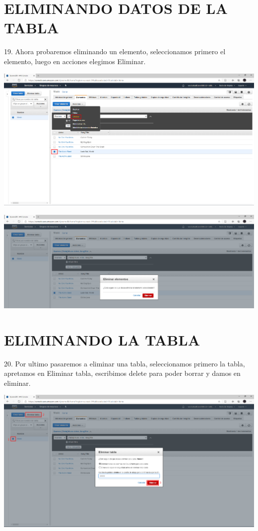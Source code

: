 \documentclass[12pt,letterpaper]{article}
\begin{document}
\section{ELIMINANDO DATOS DE LA TABLA}
19.	Ahora probaremos eliminando un elemento, seleccionamos primero el elemento, luego en acciones elegimos Eliminar.
\begin{center}
    \includegraphics[width=15cm]{img/19.png}  
\end{center}
\begin{center}
    \includegraphics[width=15cm]{img/19.1.png}  
\end{center}
\newpage

\section{ELIMINANDO LA TABLA}
20.	Por ultimo pasaremos a eliminar una tabla, seleccionamos primero la tabla, apretamos en Eliminar tabla, escribimos delete para poder borrar y damos en eliminar.
\begin{center}
    \includegraphics[width=15cm]{img/20.png}  
\end{center}
\end{document}
